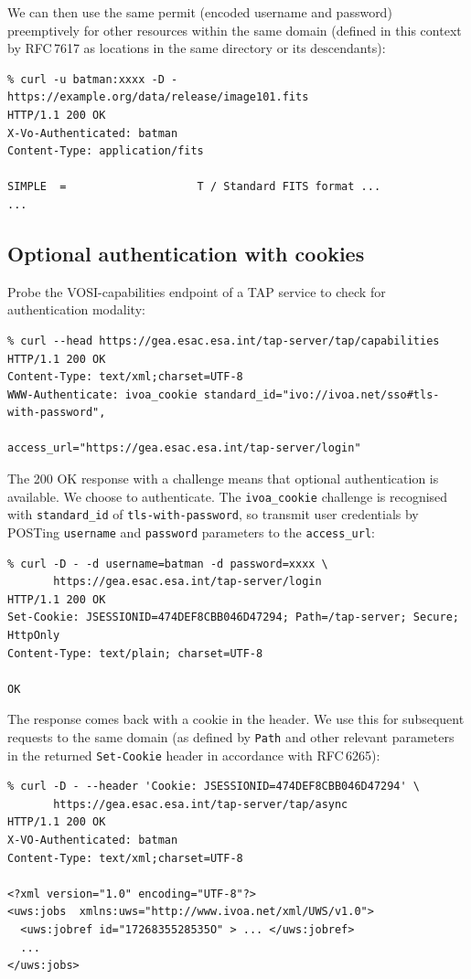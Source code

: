 \documentclass[11pt,a4paper]{ivoa}
\newcommand{\rfc}[1]{RFC\,#1}
\newcommand{\header}[1]{{\tt #1}}
\begin{document}
\noindent
We can then use the same permit (encoded username and password)
preemptively for other resources within the same domain
(defined in this context by \rfc{7617} as locations in the same
directory or its descendants):
{\footnotesize
\begin{verbatim}
% curl -u batman:xxxx -D - https://example.org/data/release/image101.fits
HTTP/1.1 200 OK
X-Vo-Authenticated: batman
Content-Type: application/fits

SIMPLE  =                    T / Standard FITS format ...
...
\end{verbatim}
}


\subsection{Optional authentication with cookies}
\label{sec:cookie-example}


Probe the VOSI-capabilities endpoint of a TAP service to check
for authentication modality:
{\footnotesize
\begin{verbatim}
% curl --head https://gea.esac.esa.int/tap-server/tap/capabilities
HTTP/1.1 200 OK
Content-Type: text/xml;charset=UTF-8
WWW-Authenticate: ivoa_cookie standard_id="ivo://ivoa.net/sso#tls-with-password",
                              access_url="https://gea.esac.esa.int/tap-server/login"
\end{verbatim}
}

\noindent
The 200 OK response with a challenge means that optional authentication
is available.
We choose to authenticate.
The \verb|ivoa_cookie| challenge is recognised with \verb|standard_id|
of \verb|tls-with-password|, so transmit user credentials
by POSTing \verb|username| and \verb|password| parameters
to the \verb|access_url|:
{\footnotesize
\begin{verbatim}
% curl -D - -d username=batman -d password=xxxx \
       https://gea.esac.esa.int/tap-server/login
HTTP/1.1 200 OK
Set-Cookie: JSESSIONID=474DEF8CBB046D47294; Path=/tap-server; Secure; HttpOnly
Content-Type: text/plain; charset=UTF-8

OK
\end{verbatim}
}

\noindent
The response comes back with a cookie in the header.
We use this for subsequent requests to the same domain
(as defined by {\tt Path} and other relevant parameters in the
returned \header{Set-Cookie} header in accordance with \rfc{6265}):
{\footnotesize
\begin{verbatim}
% curl -D - --header 'Cookie: JSESSIONID=474DEF8CBB046D47294' \
       https://gea.esac.esa.int/tap-server/tap/async
HTTP/1.1 200 OK
X-VO-Authenticated: batman
Content-Type: text/xml;charset=UTF-8

<?xml version="1.0" encoding="UTF-8"?>
<uws:jobs  xmlns:uws="http://www.ivoa.net/xml/UWS/v1.0">
  <uws:jobref id="1726835528535O" > ... </uws:jobref>
  ...
</uws:jobs>
\end{verbatim}
}
\end{document}
